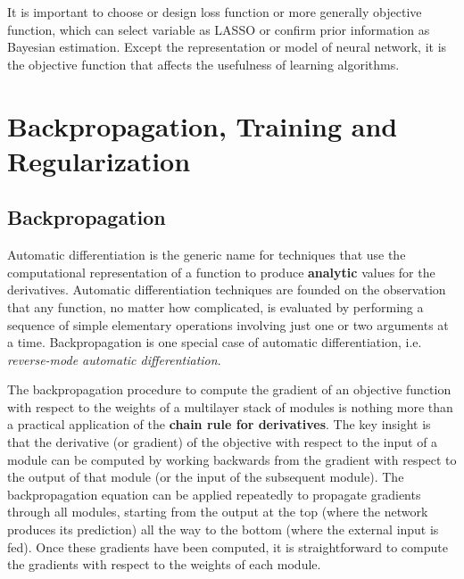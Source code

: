 \documentclass[titlestyle=hang,11pt]{elegantbook}
\begin{document}
It is important to choose or design loss function or more generally objective function,
which can select variable as LASSO or confirm prior information as Bayesian estimation.
Except the representation or model of neural network, it is the objective function that affects the usefulness of learning algorithms.

%


\section{Backpropagation, Training and Regularization}

\subsection{Backpropagation}

Automatic differentiation is the generic name for techniques that use the computational representation of a function to produce \textbf{analytic} values for the derivatives.
Automatic differentiation techniques are founded on the observation that 
any function, no matter how complicated, is evaluated by performing a sequence of simple elementary operations involving just one or two arguments at a time.
Backpropagation is one special case of automatic differentiation, i.e. \emph{reverse-mode automatic differentiation}.

The backpropagation procedure to compute the gradient of an objective function with respect to the weights of a multilayer stack of modules is 
nothing more than a practical application of the \textbf{chain rule for derivatives}.
The key insight is that the derivative (or gradient) of the objective with respect to the input of a module can be computed 
by working backwards from the gradient with respect to the output of that module (or the input of the subsequent module).
The backpropagation equation can be applied repeatedly to
propagate gradients through all modules, starting from the output at the top (where the network produces its prediction) all the way to the bottom (where the external input is fed).
Once these gradients have been computed, it is straightforward to compute the gradients with respect to the weights of each module.
\end{document}

